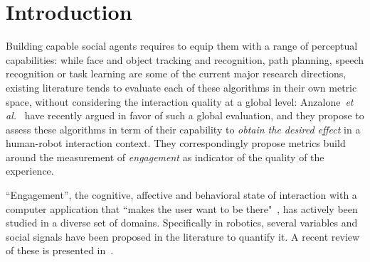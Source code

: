 \documentclass{sig-alternate}
\newcommand{\etal}{\textit{et al.}\xspace}
\begin{document}

\section{Introduction}

%

Building capable social agents requires to equip them with a range
of perceptual capabilities: while face and object tracking and
recognition, path planning, speech recognition or task learning are some of the current major research
directions, existing literature tends to evaluate each of these algorithms in
their own metric space, without considering the interaction quality at a global
level: Anzalone~\etal~\cite{anzalone} have recently argued in favor of
such a global evaluation, and they propose to assess these algorithms in term of
their capability to \emph{obtain the desired effect} in a human-robot interaction
context. They correspondingly propose metrics build around the measurement
of \emph{engagement} as indicator of the quality of the experience.

``Engagement'', the cognitive, affective and behavioral state of interaction
with a computer application that ``makes the user want to be
there"~\cite{OBrien:2010}, has actively been studied in a diverse set of
domains. Specifically in robotics, several variables and social signals have been proposed in the
literature to quantify it. A recent review of these is presented in~\cite{ivaldi2015towards}.
\end{document}
